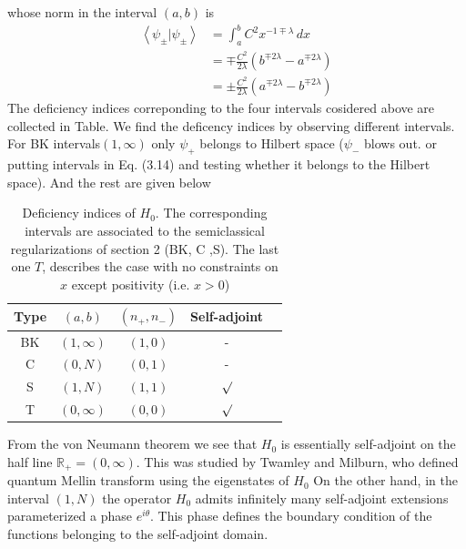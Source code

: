 \documentclass[12pt]{report}
\newcommand*{\1}{\hspace{1pt}}
\begin{document}
        whose norm in the interval $(a,b)$ is
        \begin{equation}
            \begin{split}
            \left\langle \psi_{\pm} | \psi_{\pm} \right\rangle &= \int_{a}^{b} C^{2} x^{-1\mp \lambda} \,dx \\
            &= \mp \frac{C^{2}}{2\lambda}\left(b^{\mp 2\lambda} - a^{\mp 2\lambda}\right) \\  
            &= \pm \frac{C^{2}}{2\lambda}\left(a^{\mp 2\lambda} - b^{\mp 2\lambda}\right) 
            \end{split}
        \end{equation}
        The deficiency indices correponding to the four intervals cosidered above are collected in Table\cite{s8}. We find the deficency indices by observing different intervals.
        For BK intervals$(1,\infty)$ only $\psi_{+}$ belongs to Hilbert space ($\psi_{-}$ blows out. or putting intervals in Eq. (3.14) and testing whether it belongs to
        the Hilbert space)\cite{s7}. And the rest are given below
        
        \begin{longtable}[c]{c c c c c}
            \caption{Deficiency indices of $H_{0}$. The corresponding intervals are associated to the semiclassical regularizations of section 2 (BK, C ,S).
            The last one $T$, describes the case with no constraints on $x$ except positivity (i.e. $x>0$)} \\
            \hline
             Type & $(a,b)$ & $(n_{+}, n_{-})$ & Self-adjoint\\
             \hline 
             BK & $(1,\infty)$ & $(1,0)$ & -\\  
             C & $(0,N)$ & $(0,1)$ &  -\\ 
             S & $(1,N)$ & $(1,1)$ & $\surd$ \\ 
             T & $(0,\infty)$ & $(0,0)$ & $\surd $\\ 
            \hline
        \end{longtable}


        From the von Neumann theorem we see that $H_{0}$ is essentially self-adjoint on the half line $\mathbb{R} _{+} = (0, \infty)$. This was studied by Twamley and Milburn, who
        defined quantum Mellin transform using the eigenstates of $H_{0}$\cite{s9}
        On the other hand, in the interval $(1,N)$ the operator $H_{0}$ admits infinitely many self-adjoint extensions parameterized a phase $e^{i\theta}$. This phase defines the 
        boundary condition of the functions belonging to the self-adjoint domain.\cite{s7}
\end{document}
